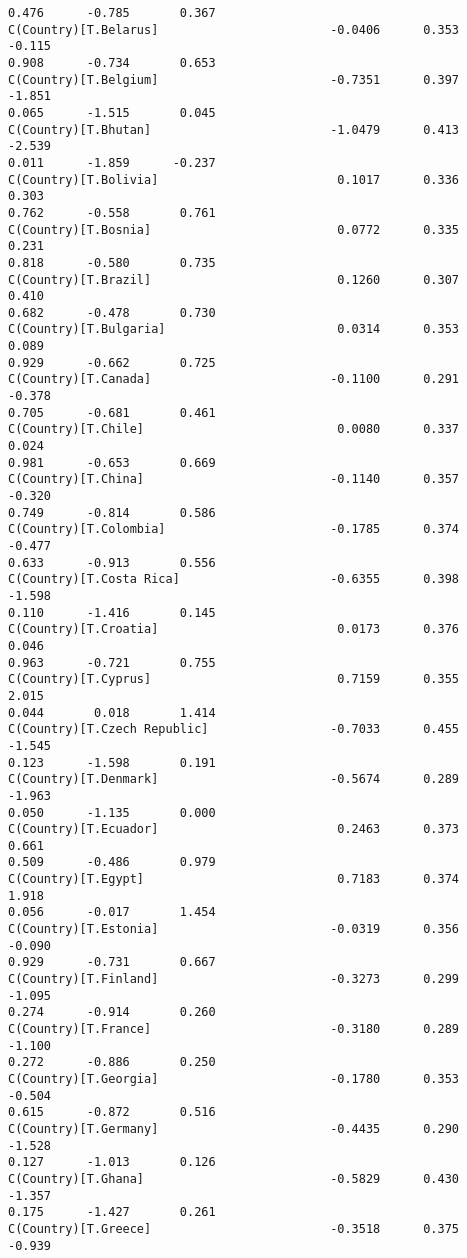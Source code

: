 \documentclass[11pt]{article}
\begin{document}
\begin{Verbatim}[commandchars=\\\{\}]
0.476      -0.785       0.367
C(Country)[T.Belarus]                        -0.0406      0.353     -0.115
0.908      -0.734       0.653
C(Country)[T.Belgium]                        -0.7351      0.397     -1.851
0.065      -1.515       0.045
C(Country)[T.Bhutan]                         -1.0479      0.413     -2.539
0.011      -1.859      -0.237
C(Country)[T.Bolivia]                         0.1017      0.336      0.303
0.762      -0.558       0.761
C(Country)[T.Bosnia]                          0.0772      0.335      0.231
0.818      -0.580       0.735
C(Country)[T.Brazil]                          0.1260      0.307      0.410
0.682      -0.478       0.730
C(Country)[T.Bulgaria]                        0.0314      0.353      0.089
0.929      -0.662       0.725
C(Country)[T.Canada]                         -0.1100      0.291     -0.378
0.705      -0.681       0.461
C(Country)[T.Chile]                           0.0080      0.337      0.024
0.981      -0.653       0.669
C(Country)[T.China]                          -0.1140      0.357     -0.320
0.749      -0.814       0.586
C(Country)[T.Colombia]                       -0.1785      0.374     -0.477
0.633      -0.913       0.556
C(Country)[T.Costa Rica]                     -0.6355      0.398     -1.598
0.110      -1.416       0.145
C(Country)[T.Croatia]                         0.0173      0.376      0.046
0.963      -0.721       0.755
C(Country)[T.Cyprus]                          0.7159      0.355      2.015
0.044       0.018       1.414
C(Country)[T.Czech Republic]                 -0.7033      0.455     -1.545
0.123      -1.598       0.191
C(Country)[T.Denmark]                        -0.5674      0.289     -1.963
0.050      -1.135       0.000
C(Country)[T.Ecuador]                         0.2463      0.373      0.661
0.509      -0.486       0.979
C(Country)[T.Egypt]                           0.7183      0.374      1.918
0.056      -0.017       1.454
C(Country)[T.Estonia]                        -0.0319      0.356     -0.090
0.929      -0.731       0.667
C(Country)[T.Finland]                        -0.3273      0.299     -1.095
0.274      -0.914       0.260
C(Country)[T.France]                         -0.3180      0.289     -1.100
0.272      -0.886       0.250
C(Country)[T.Georgia]                        -0.1780      0.353     -0.504
0.615      -0.872       0.516
C(Country)[T.Germany]                        -0.4435      0.290     -1.528
0.127      -1.013       0.126
C(Country)[T.Ghana]                          -0.5829      0.430     -1.357
0.175      -1.427       0.261
C(Country)[T.Greece]                         -0.3518      0.375     -0.939

\end{Verbatim}
\end{document}
